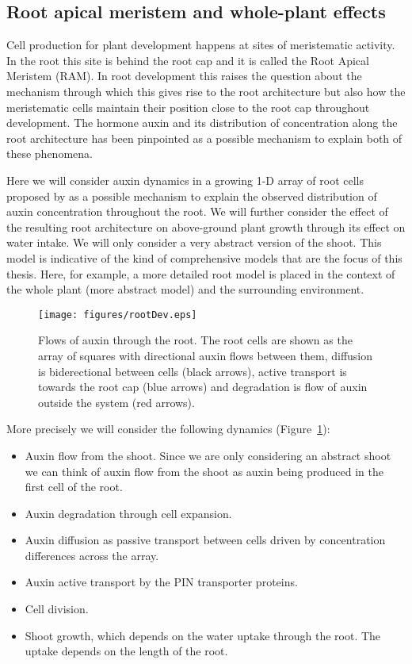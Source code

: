 \subsection{Root apical meristem and whole-plant effects}
\label{sec:rootDev}
Cell production for plant development happens at sites of meristematic
activity. In the root this site is behind the root cap and it is called the Root
Apical Meristem (RAM). In root development this raises the question about the
mechanism through which this gives rise to the root architecture but also how
the meristematic cells maintain their position close to the root cap throughout
development. The hormone auxin and its distribution of concentration along the
root architecture has been pinpointed as a possible mechanism to explain both of
these phenomena.

Here we will consider auxin dynamics in a growing 1-D array of root cells
proposed by \citet{mironova_plausible_2010} as a possible mechanism to explain
the observed distribution of auxin concentration throughout the root. We will
further consider the effect of the resulting root architecture on above-ground
plant growth through its effect on water intake. We will only consider a very
abstract version of the shoot. This model is indicative of the kind of
comprehensive models that are the focus of this thesis. Here, for example, a
more detailed root model is placed in the context of the whole plant (more
abstract model) and the surrounding environment.

\begin{figure}
\centering
\texttt{[image: figures/rootDev.eps]}
\caption{Flows of auxin through the root. The root cells are shown as the array
  of squares with directional auxin flows between them, diffusion is biderectional
  between cells (black arrows), active transport is towards the root cap (blue
  arrows) and degradation is flow of auxin outside the system (red arrows).}
\label{fig:rootDev}
\end{figure}

More precisely we will consider the following dynamics
(Figure~\ref{fig:rootDev}):
\begin{itemize}
\item Auxin flow from the shoot. Since we are only considering an abstract shoot
  we can think of auxin flow from the shoot as auxin being produced in the first
  cell of the root.
\item Auxin degradation through cell expansion.
\item Auxin diffusion as passive transport between cells driven by concentration
  differences across the array.
\item Auxin active transport by the PIN transporter proteins.
\item Cell division.
\item Shoot growth, which depends on the water uptake through the root. The
  uptake depends on the length of the root.
\end{itemize}


